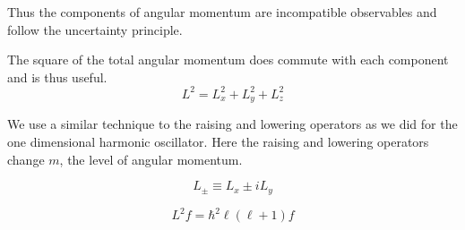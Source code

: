 Thus the components of angular momentum are incompatible observables and follow the uncertainty principle.

The square of the total angular momentum does commute with each component and is thus useful.
\begin{equation}
  L^2=L_{x}^2+L_{y}^2+L_{z}^2
\end{equation}

We use a similar technique to the raising and lowering operators as we did for the one dimensional harmonic oscillator. Here the raising and lowering operators change $ m $, the level of angular momentum.

\begin{equation}
  L_{\pm}\equiv L_{x}\pm i L_{y}
\end{equation}

\begin{equation}
  L^2f=\hbar^2\ell(\ell+1)f
\end{equation}

